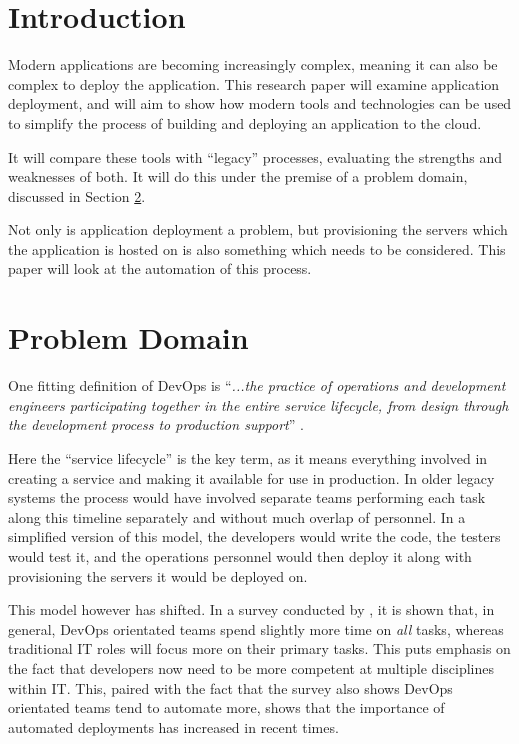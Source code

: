 \documentclass{article}
\author{Stephen Coady}
\begin{document}
\hypersetup{pageanchor=false}

\thispagestyle{empty}
\hypersetup{pageanchor=true}
\newpage
\tableofcontents
\newpage

\newpage
\section{Introduction} %
\label{sec:Introduction}
Modern applications are becoming increasingly complex, meaning it can also be complex to deploy the application. This research paper will examine application deployment, and will aim to show how modern tools and technologies can be used to simplify the process of building and deploying an application to the cloud. 

It will compare these tools with ``legacy'' processes, evaluating the strengths and weaknesses of both. It will do this under the premise of a problem domain, discussed in Section \ref{sec:Problem}.

Not only is application deployment a problem, but provisioning the servers which the application is hosted on is also something which needs to be considered. This paper will look at the automation of this process.

\section{Problem Domain}
\label{sec:Problem} 

One fitting definition of DevOps is ``\textit{...the practice of operations and development engineers participating together in the entire service lifecycle, from design through the development process to production support}'' \citep{devops}.

Here the ``service lifecycle'' is the key term, as it means everything involved in creating a service and making it available for use in production. In older legacy systems the process would have involved separate teams performing each task along this timeline separately and without much overlap of personnel. In a simplified version of this model, the developers would write the code, the testers would test it, and the operations personnel would then deploy it along with provisioning the servers it would be deployed on.

This model however has shifted. In a survey conducted by \citep{survey}, it is shown that, in general, DevOps orientated teams spend slightly more time on \textit{all} tasks, whereas traditional IT roles will focus more on their primary tasks. This puts emphasis on the fact that developers now need to be more competent at multiple disciplines within IT. This, paired with the fact that the survey also shows DevOps orientated teams tend to automate more, shows that the importance of automated deployments has increased in recent times. 
\end{document}
